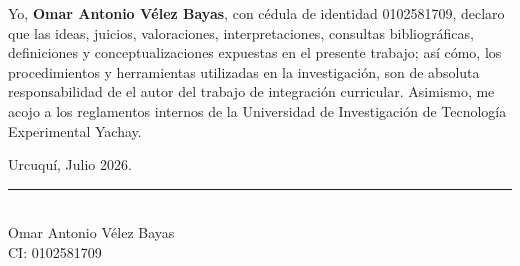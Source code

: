 
Yo, \textbf{Omar Antonio Vélez Bayas}, con cédula de identidad 0102581709, declaro que las ideas, juicios, valoraciones, interpretaciones, consultas bibliográficas, definiciones y conceptualizaciones expuestas en el presente trabajo; así cómo, los procedimientos y herramientas utilizadas en la investigación, son de absoluta responsabilidad de el autor del trabajo de integración curricular. Asimismo, me acojo a los reglamentos internos de la Universidad de Investigación de Tecnología Experimental Yachay.

\vspace{0.6cm}

\noindent Urcuquí, Julio 2026.

\vspace{2.5cm}

\begin{center}
    \rule[0mm]{70mm}{0.1mm} \\
    {Omar Antonio Vélez Bayas}\\
    CI: 0102581709
\end{center}

\thispagestyle{empty} %
